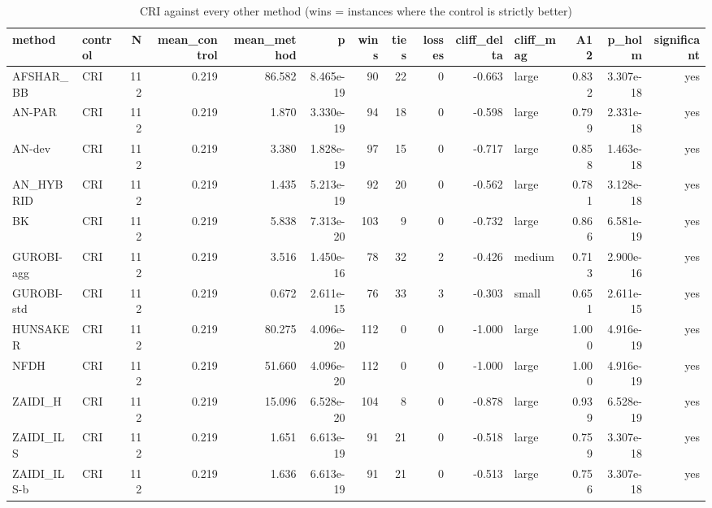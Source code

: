 \begin{table}[htbp]
\centering
\small
\caption{CRI against every other method (wins = instances where the control is strictly better)}
\label{tab:E10a_state_of_the_art_b10_vs_CRI}
\begin{tabular}{llrrrrrrrrlrrr}
\toprule
method & control & N & mean\_control & mean\_method & p & wins & ties & losses & cliff\_delta & cliff\_mag & A12 & p\_holm & significant \\
\midrule
AFSHAR\_BB & CRI & 112 & 0.219 & 86.582 & 8.465e-19 & 90 & 22 & 0 & -0.663 & large & 0.832 & 3.307e-18 & yes \\
AN-PAR & CRI & 112 & 0.219 & 1.870 & 3.330e-19 & 94 & 18 & 0 & -0.598 & large & 0.799 & 2.331e-18 & yes \\
AN-dev & CRI & 112 & 0.219 & 3.380 & 1.828e-19 & 97 & 15 & 0 & -0.717 & large & 0.858 & 1.463e-18 & yes \\
AN\_HYBRID & CRI & 112 & 0.219 & 1.435 & 5.213e-19 & 92 & 20 & 0 & -0.562 & large & 0.781 & 3.128e-18 & yes \\
BK & CRI & 112 & 0.219 & 5.838 & 7.313e-20 & 103 & 9 & 0 & -0.732 & large & 0.866 & 6.581e-19 & yes \\
GUROBI-agg & CRI & 112 & 0.219 & 3.516 & 1.450e-16 & 78 & 32 & 2 & -0.426 & medium & 0.713 & 2.900e-16 & yes \\
GUROBI-std & CRI & 112 & 0.219 & 0.672 & 2.611e-15 & 76 & 33 & 3 & -0.303 & small & 0.651 & 2.611e-15 & yes \\
HUNSAKER & CRI & 112 & 0.219 & 80.275 & 4.096e-20 & 112 & 0 & 0 & -1.000 & large & 1.000 & 4.916e-19 & yes \\
NFDH & CRI & 112 & 0.219 & 51.660 & 4.096e-20 & 112 & 0 & 0 & -1.000 & large & 1.000 & 4.916e-19 & yes \\
ZAIDI\_H & CRI & 112 & 0.219 & 15.096 & 6.528e-20 & 104 & 8 & 0 & -0.878 & large & 0.939 & 6.528e-19 & yes \\
ZAIDI\_ILS & CRI & 112 & 0.219 & 1.651 & 6.613e-19 & 91 & 21 & 0 & -0.518 & large & 0.759 & 3.307e-18 & yes \\
ZAIDI\_ILS-b & CRI & 112 & 0.219 & 1.636 & 6.613e-19 & 91 & 21 & 0 & -0.513 & large & 0.756 & 3.307e-18 & yes \\
\bottomrule
\end{tabular}
\end{table}
